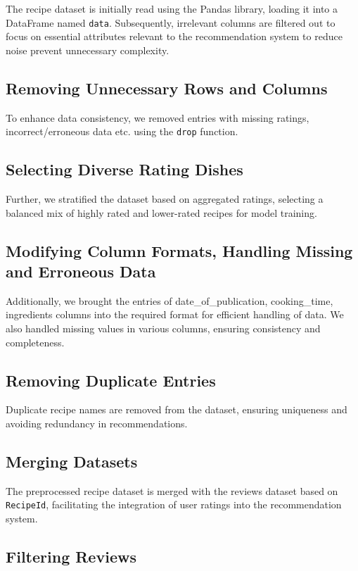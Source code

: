 \documentclass[conference]{IEEEtran}
\begin{document}
The recipe dataset is initially read using the Pandas library, loading it into a DataFrame named \texttt{data}. Subsequently, irrelevant columns are filtered out to focus on essential attributes relevant to the recommendation system to reduce noise prevent unnecessary complexity.

\subsection{Removing Unnecessary Rows and Columns}

To enhance data consistency, we removed entries with missing ratings, incorrect/erroneous data etc. using the \texttt{drop} function.

\subsection{Selecting Diverse Rating Dishes}

Further, we stratified the dataset based on aggregated ratings, selecting a balanced mix of highly rated and lower-rated recipes for model training.

\subsection{Modifying Column Formats, Handling Missing and Erroneous Data}

 Additionally, we brought the entries of date\_of\_publication, cooking\_time, ingredients  columns into the required format for efficient handling of data. We also handled missing values in various columns, ensuring consistency and completeness.

\subsection{Removing Duplicate Entries}

Duplicate recipe names are removed from the dataset, ensuring uniqueness and avoiding redundancy in recommendations.

\subsection{Merging Datasets}

The preprocessed recipe dataset is merged with the reviews dataset based on \texttt{RecipeId}, facilitating the integration of user ratings into the recommendation system.

\subsection{Filtering Reviews}
\end{document}
